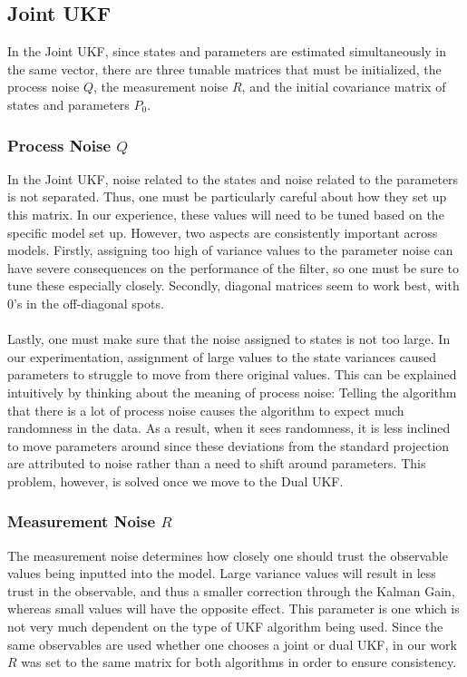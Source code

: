 \subsection{Joint UKF}

In the Joint UKF, since states and parameters are estimated simultaneously in the same vector, there are three tunable matrices that must be initialized, the process noise $Q$, the measurement noise $R$, and the initial covariance matrix of states and parameters $P_0$. 

\subsubsection{Process Noise $Q$}
In the Joint UKF, noise related to the states and noise related to the parameters is not separated. Thus, one must be particularly careful about how they set up this matrix. In our experience, these values will need to be tuned based on the specific model set up. However, two aspects are consistently important across models. Firstly, assigning too high of variance values to the parameter noise can have severe consequences on the performance of the filter, so one must be sure to tune these especially closely. Secondly, diagonal matrices seem to work best, with 0's in the off-diagonal spots. \\
\\
Lastly, one must make sure that the noise assigned to states is not too large. In our experimentation, assignment of large values to the state variances caused parameters to struggle to move from there original values. This can be explained intuitively by thinking about the meaning of process noise: Telling the algorithm that there is a lot of process noise causes the algorithm to expect much randomness in the data. As a result, when it sees randomness, it is less inclined to move parameters around since these deviations from the standard projection are attributed to noise rather than a need to shift around parameters. This problem, however, is solved once we move to the Dual UKF.

\subsubsection{Measurement Noise $R$}
The measurement noise determines how closely one should trust the observable values being inputted into the model. Large variance values will result in less trust in the observable, and thus a smaller correction through the Kalman Gain, whereas small values will have the opposite effect. This parameter is one which is not very much dependent on the type of UKF algorithm being used. Since the same observables are used whether one chooses a joint or dual UKF, in our work $R$ was set to the same matrix for both algorithms in order to ensure consistency. 

